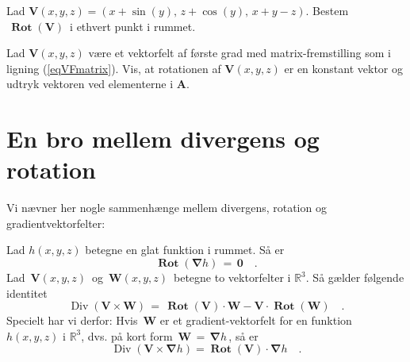\begin{exercise}
Lad ${\mathbf{V}}(x,y,z) = (x + \sin(y),\, z + \cos(y),\, x+y-z)$.
Bestem $\,\operatorname{\mathbf{Rot}}({\mathbf{V}})\,$ i ethvert punkt i rummet.
\end{exercise}

\begin{exercise}
Lad ${\mathbf{V}}(x,y,z)$ være et vektorfelt af
 første grad med matrix-fremstilling som i
ligning (\ref{eqVFmatrix}). Vis, at rotationen af
${\mathbf{V}}(x,y,z)$ er en konstant vektor og udtryk
vektoren ved elementerne i ${\mathbf{A}}$.
\end{exercise}



\section{En bro mellem divergens og rotation} \label{secBridge}

Vi nævner her nogle sammenhænge mellem divergens, rotation og gradientvektorfelter:

\begin{theorem} \label{thmDivversRot}
Lad $h(x,y,z)$ betegne en glat funktion i rummet. Så er
\begin{equation}\label{eqRotAfNabla}
\operatorname{\mathbf{Rot}} ({\bm{\nabla}}h ) \, = \, {\mathbf{0}}\quad .
\end{equation}
Lad $\,{\mathbf{V}}(x,y,z)\,$ og
$\,{\mathbf{W}}(x,y,z)\,$ betegne to vektorfelter i
$\mathbb{R}^{3}$. Så gælder følgende identitet
\begin{equation}\label{eqDivCrossprod}
\operatorname{Div}({\mathbf{V}}\times {\mathbf{W}}) \, = \,
\operatorname{\mathbf{Rot}}({\mathbf{V}})\cdot {\mathbf{W}} - {\mathbf{V}}\cdot
\operatorname{\mathbf{Rot}}({\mathbf{W}}) \quad .
\end{equation}
Specielt har vi derfor: Hvis  $\,{\mathbf{W}}$ er et
gradient-vektorfelt for en funktion $h(x,y,z)$
i $\mathbb{R}^{3}$, dvs.  på kort form $\,{\mathbf{W}} \, = \,
{\bm{\nabla}}h\,$, så er
\begin{equation}\label{eqRotDivGrad}
\operatorname{Div}({\mathbf{V}}\times {\bm{\nabla}}h) =
\operatorname{\mathbf{Rot}}({\mathbf{V}})\cdot{\bm{\nabla}}h \quad .
\end{equation}
\end{theorem}

